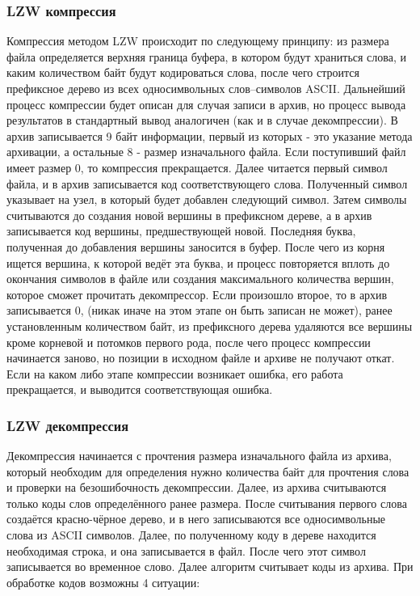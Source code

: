 \documentclass[12pt]{article}
\begin{document}
\subsubsection*{LZW компрессия}

Компрессия методом LZW происходит по следующему принципу: из размера файла определяется верхняя граница буфера, в котором будут храниться слова, и каким количеством байт будут кодироваться слова, после чего строится префиксное дерево из всех односимвольных слов--символов ASCII. Дальнейший процесс компрессии будет описан для случая записи в архив, но процесс вывода результатов в стандартный вывод аналогичен (как и в случае декомпрессии). В архив записывается 9 байт информации, первый из которых - это указание метода архивации, а остальные 8 - размер изначального файла. Если поступивший файл имеет размер $0$, то компрессия прекращается. Далее читается первый символ файла, и в архив записывается код соответствующего слова. Полученный символ указывает на узел, в который будет добавлен следующий символ. Затем символы считываются до создания новой вершины в префиксном дереве, а в архив записывается код вершины, предшествующей новой. Последняя буква, полученная до добавления вершины заносится в буфер. После чего из корня ищется вершина, к которой ведёт эта буква, и процесс повторяется вплоть до окончания символов в файле или создания максимального количества вершин, которое сможет прочитать декомпрессор. Если произошло второе, то в архив записывается $0$, (никак иначе на этом этапе он быть записан не может), ранее установленным количеством байт, из префиксного дерева удаляются все вершины кроме корневой и потомков первого рода, после чего процесс компрессии начинается заново, но позиции в исходном файле и архиве не получают откат. Если на каком либо этапе компрессии возникает ошибка, его работа прекращается, и выводится соответствующая ошибка.

\subsubsection*{LZW декомпрессия}

Декомпрессия начинается с прочтения размера изначального файла из архива, который необходим для определения нужно количества байт для прочтения слова и проверки на безошибочность декомпрессии. Далее, из архива считываются только коды слов определённого ранее размера. После считывания первого слова создаётся красно-чёрное дерево, и в него записываются все односимвольные слова из ASCII символов. Далее, по полученному коду в дереве находится необходимая строка, и она записывается в файл. После чего этот символ записывается во временное слово. Далее алгоритм считывает коды из архива. При обработке кодов возможны 4 ситуации:
\end{document}
